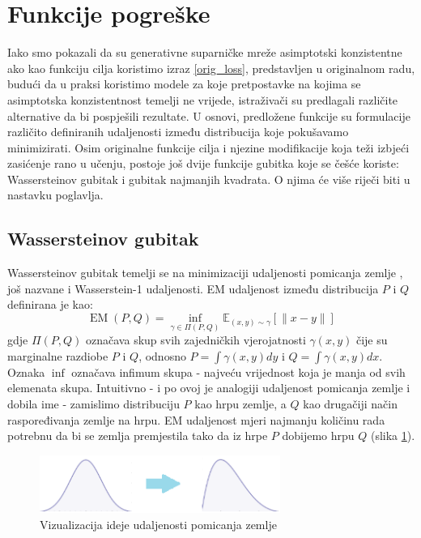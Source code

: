 \section{Funkcije pogreške}
Iako smo pokazali da su generativne suparničke mreže asimptotski konzistentne ako kao funkciju cilja koristimo izraz \ref{orig_loss}, predstavljen u originalnom radu, budući da u praksi koristimo modele za koje pretpostavke na kojima se asimptotska konzistentnost temelji ne vrijede, istraživači su predlagali različite alternative da bi pospješili rezultate. U osnovi, predložene funkcije su formulacije različito definiranih udaljenosti između distribucija koje pokušavamo minimizirati. Osim originalne funkcije cilja i njezine modifikacije koja teži izbjeći zasićenje rano u učenju, postoje još dvije funkcije gubitka koje se češće koriste: Wassersteinov gubitak i gubitak najmanjih kvadrata. O njima će više riječi biti u nastavku poglavlja.

\subsection{Wassersteinov gubitak}
Wassersteinov gubitak \citep{arjovsky2017wasserstein} temelji se na minimizaciji udaljenosti pomicanja zemlje , još nazvane i Wasserstein-1 udaljenosti. EM udaljenost između distribucija $P$ i $Q$ definirana je kao:
\begin{equation}
\label{em_distance}
\operatorname*{EM}(P, Q) = \inf_{\gamma \in \Pi(P, Q)} \mathbb{E}_{(x, y) \sim \gamma} \left[ \|x - y\|\right]
\end{equation}
gdje $\Pi(P, Q)$ označava skup svih zajedničkih vjerojatnosti $\gamma(x, y)$ čije su marginalne razdiobe $P$ i $Q$, odnosno $P = \int \gamma(x, y)dy$ i $Q = \int \gamma(x, y)dx$. Oznaka $\inf$ označava infimum skupa - najveću vrijednost koja je manja od svih elemenata skupa. Intuitivno - i po ovoj je analogiji udaljenost pomicanja zemlje i dobila ime - zamislimo distribuciju $P$ kao hrpu zemlje, a $Q$ kao drugačiji način raspoređivanja zemlje na hrpu. EM udaljenost mjeri najmanju količinu rada potrebnu da bi se zemlja premjestila tako da iz hrpe $P$ dobijemo hrpu $Q$ (slika \ref{emd}).

\begin{figure}[h]
\centering
\includegraphics[width=0.7\textwidth]{images/emd.png}
\caption{Vizualizacija ideje udaljenosti pomicanja zemlje}
\label{emd}
\end{figure}

